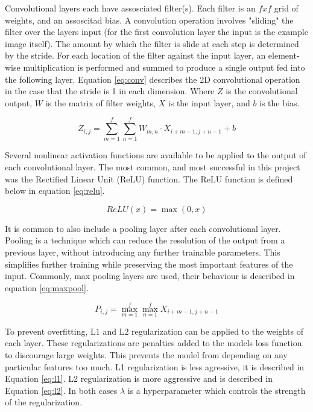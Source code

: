 \documentclass[10pt]{article}
\begin{document}
Convolutional layers each have assosciated filter(s). Each filter is an $fxf$ grid
of weights, and an assoscitad bias. A convolution operation involves "sliding"
the filter over the layers input (for the first convolution layer the input is the
example image itself). The amount by which the filter is slide at each step is determined
by the stride. For each location of the filter against the input layer, an element-wise
multiplication is performed and summed to produce a single output fed into the following layer.
Equation \ref{eq:conv} describes the 2D convolutional operation in the case that the
stride is 1 in each dimension. Where $Z$ is the convolutional output, $W$ is the
matrix of filter weights, $X$ is the input layer, and $b$ is the bias.

\begin{equation}\label{eq:conv}
  Z_{i,j} = \sum_{m=1}^{f}\sum_{n=1}^{f} W_{m,n} \cdot X_{i+m-1,j+n-1} + b
\end{equation}

Several nonlinear activation functions are available to be applied to the output
of each convolutional layer. The most common, and most successful in this project
was the Rectified Linear Unit (ReLU) function. The ReLU function is defined below in
equation \ref{eq:relu}.

\begin{equation}\label{eq:relu}
  ReLU(x) = \max(0, x)
\end{equation}

It is common to also include a pooling layer after each convolutional layer. Pooling
is a technique which can reduce the resolution of the output from a previous layer,
without introducing any further trainable parameters. This simplifies further training
while preserving the most important features of the input. Commonly, max pooling layers
are used, their behaviour is described in equation \ref{eq:maxpool}.

\begin{equation}\label{eq:maxpool}
  P_{i,j} = \max_{m=1}^{f}\max_{n=1}^{f} X_{i+m-1,j+n-1}
\end{equation}

To prevent overfitting, L1 and L2 regularization can be applied to the weights of
each layer. These regularizations are penalties added to the models loss function
to discourage large weights. This prevents the model from depending on any particular
features too much. L1 regularization is less agressive, it is described in Equation
\ref{eq:l1}. L2 regularization is more aggressive and is described in Equation \ref{eq:l2}.
In both cases $\lambda$ is a hyperparameter which controls the strength of the regularization.
\end{document}
